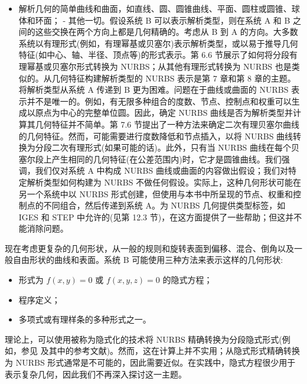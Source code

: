 \documentclass[../main.tex]{subfiles}
\begin{document}
\begin{itemize}
\item 解析几何的简单曲线和曲面，如直线、圆、圆锥曲线、平面、圆柱或圆锥、球体和环面； - 其他一切。假设系统 B 可以表示解析类型，则在系统 A 和 B 之间的这些交换在两个方向上都是几何精确的。考虑从 B 到 A 的方向。大多数系统以有理形式(例如，有理幂基或贝塞尔)表示解析类型，或以易于推导几何特征(如中心、轴、半径、顶点等)的形式表示。第 6.6 节展示了如何将分段有理幂基或贝塞尔形式转换为 NURBS；从其他有理形式转换为 NURBS 也是类似的。从几何特征构建解析类型的 NURBS 表示是第 7 章和第 8 章的主题。将解析类型从系统 A 传递到 B 更为困难。问题在于曲线或曲面的 NURBS 表示并不是唯一的。例如，有无限多种组合的度数、节点、控制点和权重可以生成以原点为中心的完整单位圆。因此，确定 NURBS 曲线是否为解析类型并计算其几何特征并不简单。第 7.6 节提出了一种方法来确定二次有理贝塞尔曲线的几何特征。然而，可能需要进行度数降低和节点插入，以将 NURBS 曲线转换为分段二次有理形式(如果可能的话)。此外，只有当 NURBS 曲线在每个贝塞尔段上产生相同的几何特征(在公差范围内)时，它才是圆锥曲线。我们强调，我们仅对系统 A 中构成 NURBS 曲线或曲面的内容做出假设；我们对特定解析类型如何构建为 NURBS 不做任何假设。实际上，这种几何形状可能在另一个系统中以 NURBS 形式创建，但使用与本书中所呈现的节点、权重和控制点的不同组合，然后传递到系统 A。为 NURBS 几何提供类型标签，如 IGES 和 STEP 中允许的(见第 12.3 节)，在这方面提供了一些帮助；但这并不能消除问题。
\end{itemize}

现在考虑更复杂的几何形状，从一般的规则和旋转表面到偏移、混合、倒角以及一般自由形状的曲线和表面。系统 B 可能使用三种方法来表示这样的几何形状:

\begin{itemize}
\item 形式为 \(f\left( {x,y}\right)  = 0\) 或 \(f\left( {x,y,z}\right)  = 0\) 的隐式方程；
\end{itemize}

\begin{itemize}
\item 程序定义；
\end{itemize}

\begin{itemize}
\item 多项式或有理样条的多种形式之一。
\end{itemize}

理论上，可以使用被称为隐式化的技术将 NURBS 精确转换为分段隐式形式(例如，参见 \cite{deMo84,Sede84,Hoff89} 及其中的参考文献)。然而，这在计算上并不实用；从隐式形式精确转换为 NURBS 形式通常是不可能的，因此需要近似。在实践中，隐式方程很少用于表示复杂几何，因此我们不再深入探讨这一主题。
\end{document}
